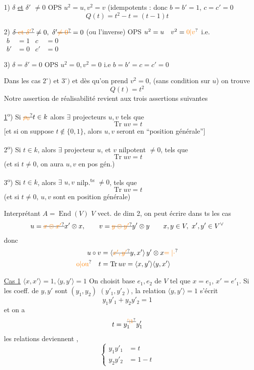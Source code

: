 1) $\delta$ \uline{et} $\delta'$ $\ne0$ \quad OPS $u^2=u,v^2=v$ (idempotents : donc $b=b'=1$, $c=c'=0$
\[
Q(t)=t^2-t=(t-1)t
\]

2) $\delta\deleted{\unsure{\text{ et }\delta'}}\ne0,\ \delta'\deleted{\unsure{\ne0}}=0$ (ou l'inverse) OPS \quad $u^2=u\quad v^2=\unsure{0|v}$ i.e. $\begin{aligned}b&=1&c&=0\\b'&=0&c'&=0\end{aligned}$

3) $\delta=\delta'=0$ \quad OPS \quad $u^2=0,v^2=0$ i.e $b=b'=c=c'=0$

Dans les cas $2^\circ)$ et $3^\circ)$ et dès qu'on prend $v^2=0$, (sans condition sur $u$) on trouve
\[
Q(t)=t^2
\]
Notre assertion de réalisabilité  revient aux trois assertions suivantes

\uline{1}\textsuperscript{o}) Si $\deleted{\unsure{\rho_0}}t\in k$  alors $\exists$ projecteurs $u,v$   tels que
\[
\operatorname{Tr}uv=t
\]
[et si on suppose $t\notin\{0,1\}$, alors $u,v$ seront en ``position générale'']

2\textsuperscript{o}) Si $t\in k$, alors $\exists$ projecteur  $u$, et $v$ nilpotent $\ne0$,  tels que
\[
\operatorname{Tr}uv=t
\]
(et si $t\ne0$, on aura $u,v$ en pos gén.)

3\textsuperscript{o}) Si $t\in k$, alors $\exists$ $u,v$ nilp.\textsuperscript{ts} $\ne0$, tels que
\[
\operatorname{Tr}uv=t
\]
(et si $t\ne0$, $u,v$ sont en position générale)

Interprétant $A=\operatorname{End}(V)$ $V$ vect. de dim 2, on peut écrire dans ts les cas
\[
u=\deleted{\unsure{x\otimes x'}}x'\otimes x,\qquad v=\deleted{\unsure{y\otimes y'}}y'\otimes y\qquad x,y\in V,\ x',y'\in V^\vee
\]
donc
\[
\begin{aligned}
u\circ v&=\langle\deleted{\unsure{x',y'}}y,x'\rangle\, y'\otimes x\unsure{=|\cdot}\\ \unsure{\text{o}|\text{ou}}\quad t&=\operatorname{Tr}uv=\langle x,y'\rangle\langle y,x'\rangle
\end{aligned}
\]

\uline{Cas 1}  $\langle x,x'\rangle=1,\langle y,y'\rangle=1$ On choisit base $e_1,e_2$ de $V$ tel que $x=e_1$, $x'=e'_1$. Si les coeff. de $y,y'$ sont $(y_1,y_2)$ $(y'_1,y'_2)$, la relation $\langle y,y'\rangle=1$
s'écrit
\[
y_1y'_1+y_2y'_2=1
\]
et on a
\[
t=y_1^{\deleted{\unsure{'|1}}}y'_1
\]
 les relations deviennent ,
\[
\left\{\begin{aligned}y_1y'_1&=t\\ y_2y'_2&=1-t\end{aligned}\right.
\]

